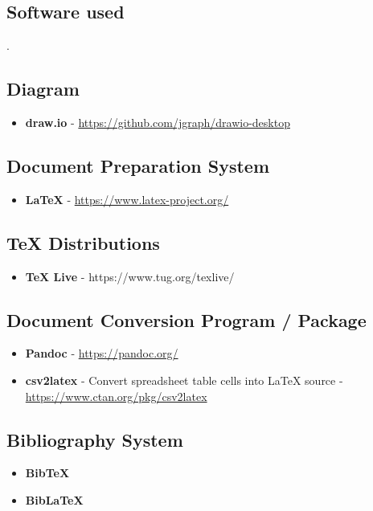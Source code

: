 \begin{appendices}
\chapter{Software used}.

\section{Diagram}
\begin{itemize}
\item \textbf{draw.io} - \url{https://github.com/jgraph/drawio-desktop}
\end{itemize}

\section{Document Preparation System}
\begin{itemize}
\item \textbf{{\LaTeX}} - \url{https://www.latex-project.org/}
\end{itemize}

\section{TeX Distributions}
\begin{itemize}
\item \textbf{TeX Live} - https://www.tug.org/texlive/
\end{itemize}

\section{Document Conversion Program / Package}
\begin{itemize}
\item \textbf{Pandoc} - \url{https://pandoc.org/}
\item \textbf{csv2latex} - Convert spreadsheet table cells into {\LaTeX} source - \url{https://www.ctan.org/pkg/csv2latex}
\end{itemize}

\section{Bibliography System}
\begin{itemize}
\item \textbf{BibTeX}
\item \textbf{BibLaTeX}
\end{itemize}


\end{appendices}
